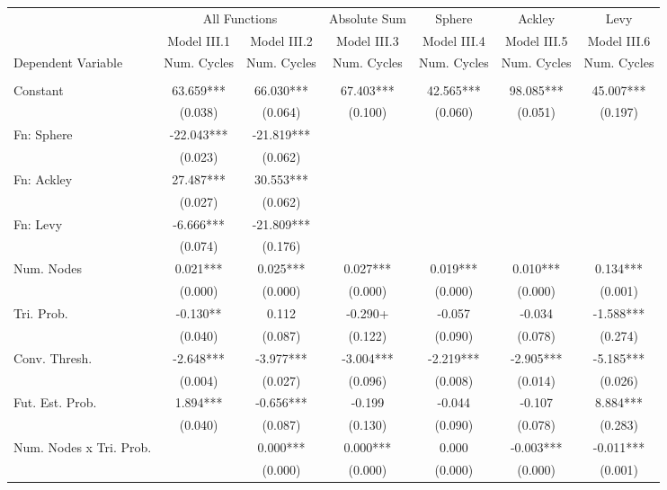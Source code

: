 \begin{table}
\centering
\begin{tabular}[t]{lcccccc}
\toprule
\multicolumn{1}{c}{ } & \multicolumn{2}{c}{All Functions} & \multicolumn{1}{c}{Absolute Sum} & \multicolumn{1}{c}{Sphere} & \multicolumn{1}{c}{Ackley} & \multicolumn{1}{c}{Levy} \\
\cmidrule(l{3pt}r{3pt}){2-3} \cmidrule(l{3pt}r{3pt}){4-4} \cmidrule(l{3pt}r{3pt}){5-5} \cmidrule(l{3pt}r{3pt}){6-6} \cmidrule(l{3pt}r{3pt}){7-7}
  & Model III.1 & Model III.2 & Model III.3 & Model III.4 & Model III.5 & Model III.6\\
\midrule
Dependent Variable & Num. Cycles & Num. Cycles & Num. Cycles & Num. Cycles & Num. Cycles & Num. Cycles\\
 &  &  &  &  &  & \\
Constant & 63.659*** & 66.030*** & 67.403*** & 42.565*** & 98.085*** & 45.007***\\
 & (0.038) & (0.064) & (0.100) & (0.060) & (0.051) & (0.197)\\
Fn: Sphere & -22.043*** & -21.819*** &  &  &  & \\
 & (0.023) & (0.062) &  &  &  & \\
Fn: Ackley & 27.487*** & 30.553*** &  &  &  & \\
 & (0.027) & (0.062) &  &  &  & \\
Fn: Levy & -6.666*** & -21.809*** &  &  &  & \\
 & (0.074) & (0.176) &  &  &  & \\
Num. Nodes & 0.021*** & 0.025*** & 0.027*** & 0.019*** & 0.010*** & 0.134***\\
 & (0.000) & (0.000) & (0.000) & (0.000) & (0.000) & (0.001)\\
Tri. Prob. & -0.130** & 0.112 & -0.290+ & -0.057 & -0.034 & -1.588***\\
 & (0.040) & (0.087) & (0.122) & (0.090) & (0.078) & (0.274)\\
Conv. Thresh. & -2.648*** & -3.977*** & -3.004*** & -2.219*** & -2.905*** & -5.185***\\
 & (0.004) & (0.027) & (0.096) & (0.008) & (0.014) & (0.026)\\
Fut. Est. Prob. & 1.894*** & -0.656*** & -0.199 & -0.044 & -0.107 & 8.884***\\
 & (0.040) & (0.087) & (0.130) & (0.090) & (0.078) & (0.283)\\
Num. Nodes x Tri. Prob. &  & 0.000*** & 0.000*** & 0.000 & -0.003*** & -0.011***\\
 &  & (0.000) & (0.000) & (0.000) & (0.000) & \vphantom{1} (0.001)\\

\end{tabular}
\end{table}
